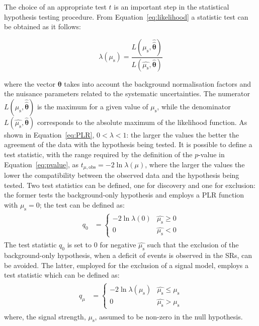 			The choice of an appropriate test $t$ is an important step in the statistical hypothesis testing procedure. From Equation~\ref{eq:likelihood} a statistic test can be obtained as it follows: 

			\begin{equation}
				\lambda \left ( \mu_{\mathrm{s}} \right ) = \frac{L\left ( \mu_{\mathrm{s}}, \hat{\hat{\bm{\theta}}} \right )}{L\left ( \hat{\mu_{\mathrm{s}}}, \hat{\bm{\theta}} \right )}
			\label{eq:PLR}
			\end{equation}

			\noindent where the vector $\bm{\theta}$ takes into account the background normalisation factors and the nuisance parameters related to the systematic uncertainties. The numerator $L\left ( \mu_{\mathrm{s}}, \hat{\hat{\bm{\theta}}} \right )$ is the maximum for a given value of $\mu_{\mathrm{s}}$, while the denominator $L\left ( \hat{\mu_{\mathrm{s}}}, \hat{\bm{\theta}} \right )$ corresponds to the absolute maximum of the likelihood function. As shown in Equation~\ref{eq:PLR}, $0 < \lambda < 1$: the larger the values the better the agreement of the data with the hypothesis being tested. It is possible to define a test statistic, with the range required by the definition of the $p$-value in Equation~\ref{eq:pvalue}, as $t_{\mu,\mathrm{obs}} = -2 \ln \lambda \left ( \mu \right )$, where the larger the values the lower the compatibility between the observed data and the hypothesis being tested. Two test statistics can be defined, one for discovery and one for exclusion: the former tests the background-only hypothesis and employs a \ac{PLR} function with $\mu_{\mathrm{s}} = 0$; the test can be defined as:
			\begin{align}
			\label{eq:test_discovery}
				\begin{split}
					q_0 & = 
					\begin{cases}
						-2 \ln \lambda \left( 0 \right ) & \hat{\mu_{\mathrm{s}}} \geq 0 \\
						0   & \hat{\mu_{\mathrm{s}}} < 0
					\end{cases}
				\end{split}
			\end{align}
			\noindent The test statistic $q_0$ is set to $0$ for negative $\hat{\mu_{\mathrm{s}}}$ such that the exclusion of the background-only hypothesis, when a deficit of events is observed in the \acp{SR}, can be avoided. The latter, employed for the exclusion of a signal model, employs a test statistic which can be defined as:
			\begin{align}
			\label{eq:test_exclusion}
				\begin{split}
					q_{\mu} & = 
					\begin{cases}
						-2 \ln \lambda \left( \mu_{\mathrm{s}} \right ) & \hat{\mu_{\mathrm{s}}} \leq \mu_{\mathrm{s}} \\
						0   & \hat{\mu_{\mathrm{s}}} > \mu_{\mathrm{s}}
					\end{cases}
				\end{split}
			\end{align}
			\noindent where, the signal strength, $\mu_{\mathrm{s}}$, assumed to be non-zero in the null hypothesis.  

